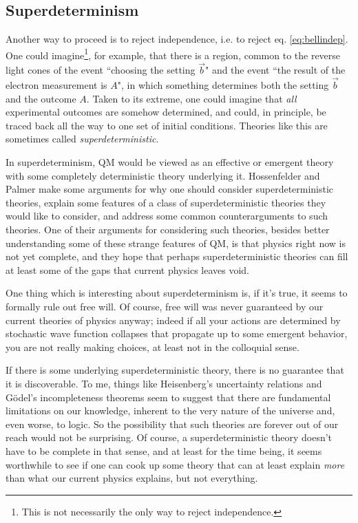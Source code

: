 \subsection{Superdeterminism}

Another way to proceed is to reject independence, i.e. to reject
eq. \eqref{eq:bellindep}. One could imagine\footnote{This is not necessarily
the only way to reject independence.}, for example, that there
is a region, common to the reverse light cones of the event ``choosing the
setting $\vec{b}$" and the event ``the result of the electron measurement
is $A$", in which something determines both the setting $\vec{b}$ and
the outcome $A$. Taken to its extreme, one could imagine that {\it all}
experimental outcomes are somehow determined, and could, in principle, be
traced back all the way to one set of initial conditions. Theories like
this are sometimes called {\it superdeterministic}.

In superdeterminism, QM would be viewed as an effective or emergent theory
with some completely deterministic theory underlying it. Hossenfelder
and Palmer \cite{hossenfelder_rethinking_2020} make some arguments for
why one should consider superdeterministic theories, explain some features
of a class of superdeterministic theories they would like to consider, and
address some common counterarguments to such theories. One of their arguments
for considering such theories, besides better understanding some of these
strange features of QM, is that physics right now is not yet complete,
and they hope that perhaps superdeterministic theories can fill at least
some of the gaps that current physics leaves void.

One thing which is interesting about superdeterminism is, if it's true,
it seems to formally rule out free will. Of course, free will was never
guaranteed by our current theories of physics anyway; indeed if all your
actions are determined by stochastic wave function collapses that 
propagate up to some emergent behavior, you are not really making
choices, at least not in the colloquial sense.

If there is some underlying superdeterministic theory, there is no guarantee
that it is discoverable. To me, things like Heisenberg's uncertainty relations
and G\"odel's incompleteness theorems seem to suggest that there are
fundamental limitations on our knowledge, inherent to the very nature of
the universe and, even worse, to logic. So the possibility that such theories
are forever out of our reach would not be surprising. Of course, a
superdeterministic theory doesn't have to be complete in that sense, and 
at least for the time being, it seems worthwhile to see if one can cook up
some theory that can at least explain {\it more} than what our current
physics explains, but not everything.





